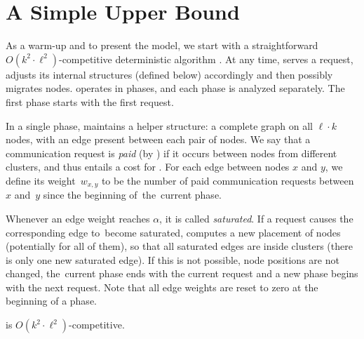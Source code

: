 \section{A Simple Upper Bound}
\label{sec:upper}

As a warm-up and to present the model, we start with a straightforward $O(k^2
\cdot \ell^2)$-com\-pe\-ti\-ti\-ve deterministic algorithm \DET. At any time, \DET
serves a request, adjusts its internal structures (defined below)
accordingly and then possibly migrates nodes. \DET operates in phases, and each
phase is analyzed separately. The first phase starts with the first request.

In a single phase, \DET maintains a helper structure: a complete graph on all
$\ell \cdot k$ nodes, with an edge present between each pair of nodes. We say
that a communication request is \emph{paid} (by \DET) if it occurs between
nodes from different clusters, and thus entails a cost for \DET. For each edge
between nodes $x$ and $y$, we define its weight~$w_{x,y}$ to be the number of
paid communication requests between $x$ and~$y$ since the beginning of~the~current phase.

Whenever an edge weight reaches $\alpha$, it is called \emph{saturated}. If a
request causes the corresponding edge to~become saturated,
\DET computes a new placement of nodes (potentially for all of them), so that all
saturated edges are inside clusters (there is only one new saturated edge). If
this is not possible, node positions are not changed, the~current phase ends
with the current request and a new phase begins with the next request. Note
that all edge weights are reset to zero at the beginning of a phase.


\begin{theorem}
\DET is $O(k^2 \cdot \ell^2)$-competitive.
\end{theorem}


